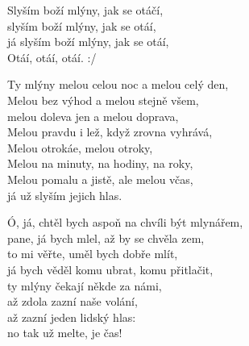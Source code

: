 \cho{}
Slyším boží mlýny, jak se otáčí,\\
slyším boží mlýny, jak se otáí,\\
já slyším boží mlýny, jak se otáí,\\
Otáí, otáí, otáí. :/

\ve{}
Ty mlýny melou celou noc a melou celý den,\\
Melou bez výhod a melou stejně všem,\\
melou doleva jen a melou doprava,\\
Melou pravdu i lež, když zrovna vyhrává,\\
Melou otrokáe, melou otroky,\\
Melou na minuty, na hodiny, na roky,\\
Melou pomalu a jistě, ale melou včas,\\
já už slyším jejich hlas.

\cho{}
\ve{}
Ó, já, chtěl bych aspoň na chvíli být mlynářem,\\
pane, já bych mlel, až by se chvěla zem,\\
to mi věřte, uměl bych dobře mlít,\\
já bych věděl komu ubrat, komu přitlačit,\\
ty mlýny čekají někde za námi,\\
až zdola zazní naše volání,\\
až zazní jeden lidský hlas:\\
no tak už melte, je čas!
\cho{}
\esong{}